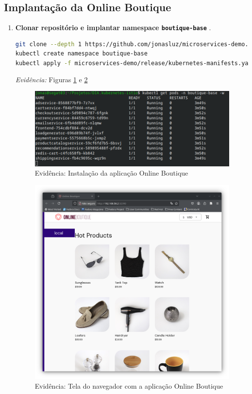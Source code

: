 \documentclass[9pt,a4paper,twocolumn,twoside]{tau-class/tau}
\begin{document}
\subsection{Implantação da Online Boutique}
\begin{enumerate}[label=\arabic*.]

\item\textbf{Clonar repositório e implantar namespace \texttt{boutique-base}} \cite{onlineboutique}.
\begin{lstlisting}[language=Bash]
git clone --depth 1 https://github.com/jonasluz/microservices-demo.git
kubectl create namespace boutique-base
kubectl apply -f microservices-demo/release/kubernetes-manifests.yaml -n boutique-base
\end{lstlisting}
\textit{Evidência:} Figuras \ref{fig:olb-istio1} e \ref{fig:olb-istio2}\\

\begin{figure}[h]
    \centering
    \includegraphics[width=1\linewidth]{figures/evidence-olbbase2.png}
    \caption{Evidência: Instalação da aplicação Online Boutique}
    \label{fig:olb-istio1}
\end{figure}

\begin{figure}[h]
    \centering
    \includegraphics[width=1\linewidth]{figures/evidence-olbbase3.png}
    \caption{Evidência: Tela do navegador com a aplicação Online Boutique}
    \label{fig:olb-istio2}
\end{figure}


\end{enumerate}
\end{document}
